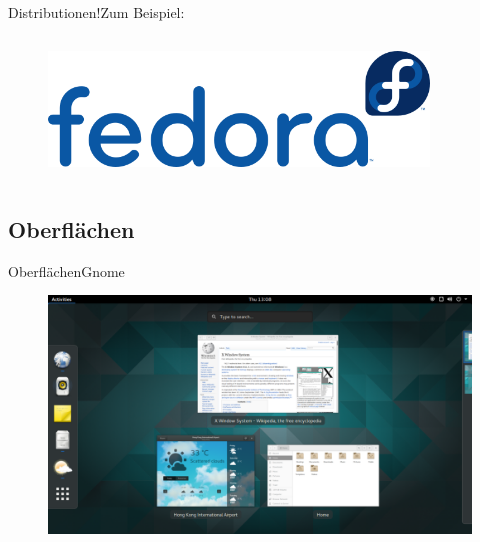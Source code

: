 \begin{frame}{Distributionen!}{Zum Beispiel:}
\begin{columns}
\begin{column}{0.5\textwidth}
\begin{figure}
\includegraphics[width=0.9\textwidth]{resources/640px-Fedora_logo_and_wordmark}
\end{figure}

\end{column}
\end{columns}
\end{frame}

\subsection{Oberflächen}
\begin{frame}{Oberflächen}{Gnome}
\begin{figure}
 \includegraphics[height=0.6\textheight]{resources/1200px-GNOME_Shell.png}
 \end{figure}

\end{frame}
